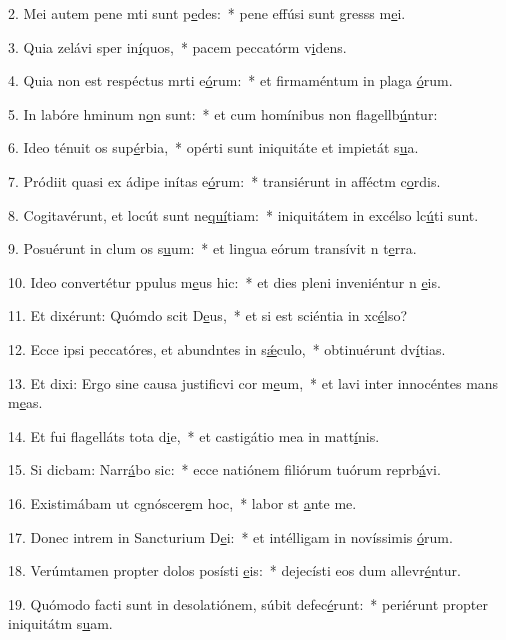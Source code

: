 2. Mei autem pene mti sunt p\uline{e}des:~* pene effúsi sunt gresss m\uline{e}i.\par 
3. Quia zelávi sper in\uline{í}quos,~* pacem peccatórm v\uline{i}dens.\par 
4. Quia non est respéctus mrti e\uline{ó}rum:~* et firmaméntum in plaga \uline{ó}rum.\par 
5. In labóre hminum n\uline{o}n sunt:~* et cum homínibus non flagellb\uline{ú}ntur:\par 
6. Ideo ténuit os sup\uline{é}rbia,~* opérti sunt iniquitáte et impietát s\uline{u}a.\par 
7. Pródiit quasi ex ádipe inítas e\uline{ó}rum:~* transiérunt in afféctm c\uline{o}rdis.\par 
8. Cogitavérunt, et locút sunt ne\uline{quí}tiam:~* iniquitátem in excélso lc\uline{ú}ti sunt.\par 
9. Posuérunt in clum os s\uline{u}um:~* et lingua eórum transívit n t\uline{e}rra.\par 
10. Ideo convertétur ppulus m\uline{e}us hic:~* et dies pleni inveniéntur n \uline{e}is.\par 
11. Et dixérunt: Quómdo scit D\uline{e}us,~* et si est sciéntia in xc\uline{é}lso?\par 
12. Ecce ipsi peccatóres, et abundntes in s\uline{ǽ}culo,~* obtinuérunt dv\uline{í}tias.\par 
13. Et dixi: Ergo sine causa justificvi cor m\uline{e}um,~* et lavi inter innocéntes mans m\uline{e}as.\par 
14. Et fui flagelláts tota d\uline{i}e,~* et castigátio mea in matt\uline{í}nis.\par 
15. Si dicbam: Narr\uline{á}bo sic:~* ecce natiónem filiórum tuórum reprb\uline{á}vi.\par 
16. Existimábam ut cgnóscer\uline{e}m hoc,~* labor st \uline{a}nte me.\par 
17. Donec intrem in Sancturium D\uline{e}i:~* et intélligam in novíssimis \uline{ó}rum.\par 
18. Verúmtamen propter dolos posísti \uline{e}is:~* dejecísti eos dum allevr\uline{é}ntur.\par 
19. Quómodo facti sunt in desolatiónem, súbit defec\uline{é}runt:~* periérunt propter iniquitátm s\uline{u}am.\par 
